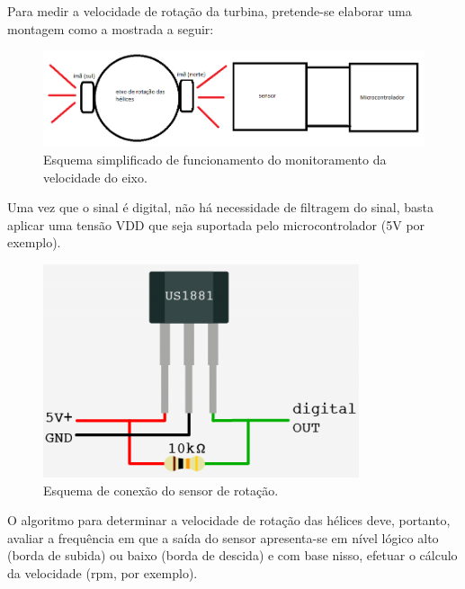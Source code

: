 	Para medir a velocidade de rotação da turbina, pretende-se elaborar uma montagem como a mostrada a seguir:
	 
	\begin{figure}[!htbp]
	  \centering
	  \includegraphics[scale=0.4]{editaveis/figuras/sensor_rotacao_monitoramento_velocidade}
	  \caption[Esquema simplificado de funcionamento do monitoramento da velocidade do eixo]
	  {Esquema simplificado de funcionamento do monitoramento da velocidade do eixo.}
	  \label{sensor_rotacao_monitoramento_velocidade}
	\end{figure}
	
	Uma vez que o sinal é digital, não há necessidade de filtragem do sinal, basta aplicar uma tensão VDD que seja suportada
	pelo microcontrolador (5V por exemplo).
	
	\begin{figure}[!htbp]
	  \centering
	  \includegraphics[scale=0.4]{editaveis/figuras/sensor_rotacao_conexao}
	  \caption[Esquema de conexão do sensor de rotação]
	  {Esquema de conexão do sensor de rotação. \footnotemark}
	  \label{sensor_rotacao_conexao}
	\end{figure}
	
	O algoritmo para determinar a velocidade de rotação das hélices deve, portanto, avaliar a frequência em que a saída do
	sensor apresenta-se em nível lógico alto (borda de subida) ou baixo (borda de descida) e com base nisso, efetuar o
	cálculo da velocidade (rpm, por exemplo).